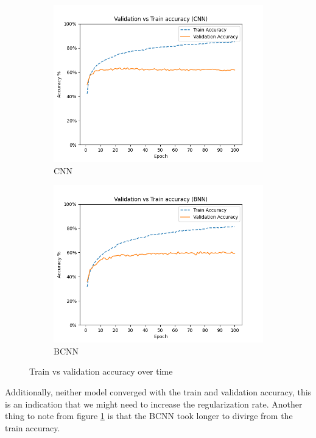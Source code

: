 \documentclass[12pt]{article}
\begin{document}
\begin{figure}[H]
	\centering
	\begin{subfigure}{.5\textwidth}
		\centering
		\includegraphics[width=\linewidth]{../Images/CNN_val_acc_over_time}
		\caption{CNN}
	\end{subfigure}%
	\begin{subfigure}{.5\textwidth}
		\centering
		\includegraphics[width=\linewidth]{../Images/BNN_val_acc_over_time}
		\caption{BCNN}
	\end{subfigure}
	\caption{Train vs validation accuracy over time}
	\label{fig:train-v-val}
\end{figure}

Additionally, neither model converged with the train and validation accuracy, this is an indication that we might need to increase the regularization rate. Another thing to note from figure \ref{fig:train-v-val} is that the BCNN took longer to divirge from the train accuracy.
\end{document}
